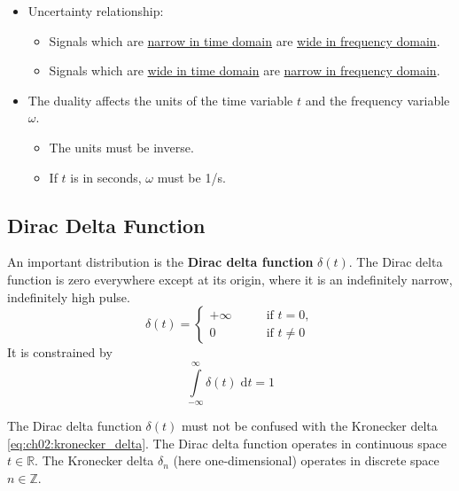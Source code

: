 \begin{refsection}
\begin{itemize}
	\item Uncertainty relationship:
	\begin{itemize}
		\item Signals which are \underline{narrow in time domain} are \underline{wide in frequency domain}.
		\item Signals which are \underline{wide in time domain} are \underline{narrow in frequency domain}.
	\end{itemize}
	\item The duality affects the units of the time variable $t$ and the frequency variable $\omega$.
	\begin{itemize}
		\item The units must be inverse.
		\item If $t$ is in seconds, $\omega$ must be \si{1/s}.
	\end{itemize}
\end{itemize}

\subsection{Dirac Delta Function} \label{sec:ch02_dirac_impulse}

An important distribution is the  \textbf{Dirac delta function} $\delta(t)$. The Dirac delta function is zero everywhere except at its origin, where it is an indefinitely narrow, indefinitely high pulse.
\begin{equation}
	\delta(t) = \begin{cases}
		+\infty & \qquad \text{if } t = 0, \\
		0 & \qquad \text{if } t \neq 0
	\end{cases}
	\label{eq:ch02:dirac_delta}
\end{equation}%
%
It is constrained by
\begin{equation}
	\int\limits_{-\infty}^{\infty} \delta(t) \; \mathrm{d} t = 1
\end{equation}

\begin{attention}
	The Dirac delta function $\delta(t)$ must not be confused with the Kronecker delta \eqref{eq:ch02:kronecker_delta}. The Dirac delta function operates in continuous space $t \in \mathbb{R}$. The Kronecker delta $\delta_n$ (here one-dimensional) operates in discrete space $n \in \mathbb{Z}$.
\end{attention}


\end{refsection}
